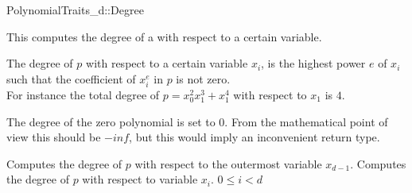 \begin{ccRefConcept}{PolynomialTraits_d::Degree}

\ccDefinition

This  computes the degree 
of a  with respect to a certain variable. 

The degree of $p$ with respect to a certain variable $x_i$, 
is the highest power $e$ of $x_i$ such that the coefficient of $x_i^{e}$ in 
$p$ is not zero.\\
For instance the total degree of $p = x_0^2x_1^3+x_1^4$ with respect to $x_1$ is $4$.

The degree of the zero polynomial is set to $0$. From the mathematical point of view this should 
be $-inf$, but this would imply an inconvenient return type. 

 

\ccRefines 
{}


\ccTypes


\ccGlue
{}

\ccOperations
{}
         {Computes the degree of $p$ with respect to the outermost variable $x_{d-1}$.}
         {Computes the degree of $p$ with respect to variable $x_i$.
         \ccPrecond $0 \leq i  < d$
         }


\ccSeeAlso

\\
\\
\\

\end{ccRefConcept}
